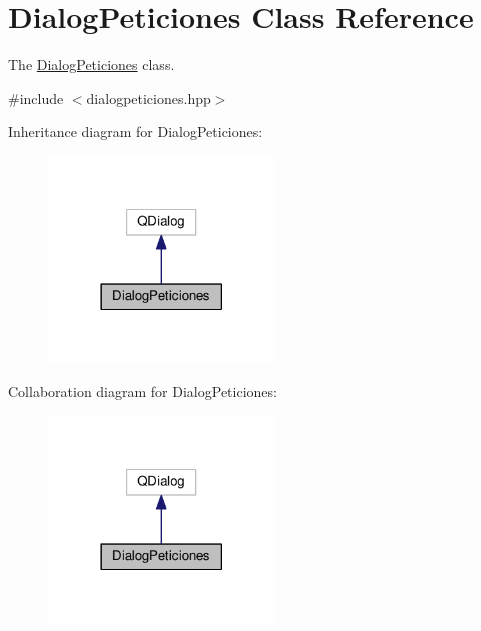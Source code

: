 \hypertarget{classDialogPeticiones}{}\section{Dialog\+Peticiones Class Reference}
\label{classDialogPeticiones}


The \hyperlink{classDialogPeticiones}{Dialog\+Peticiones} class.  




{\ttfamily \#include $<$dialogpeticiones.\+hpp$>$}



Inheritance diagram for Dialog\+Peticiones\+:
\nopagebreak
\begin{figure}[H]
\begin{center}
\leavevmode
\includegraphics[width=170pt]{classDialogPeticiones__inherit__graph}
\end{center}
\end{figure}


Collaboration diagram for Dialog\+Peticiones\+:
\nopagebreak
\begin{figure}[H]
\begin{center}
\leavevmode
\includegraphics[width=170pt]{classDialogPeticiones__coll__graph}
\end{center}
\end{figure}
